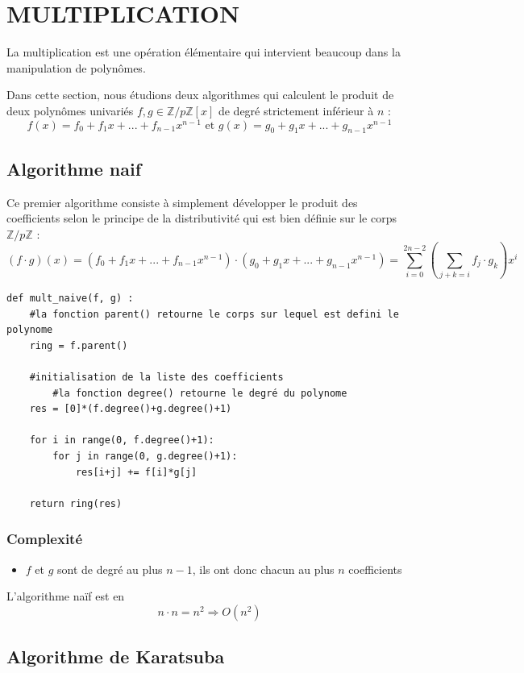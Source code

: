 \documentclass[a4paper]{article}
\begin{document}
\section{MULTIPLICATION}

La multiplication est une opération élémentaire qui intervient beaucoup dans la manipulation de polynômes.

Dans cette section, nous étudions deux algorithmes qui calculent le produit de deux polynômes univariés $f,g \in \mathbb{Z}/p\mathbb{Z}[x]$ de degré strictement inférieur à $n$ :
\[
f(x)=f_0+f_1x+...+f_{n-1}x^{n-1}\text{ et }g(x)=g_0+g_1x+...+g_{n-1}x^{n-1}
\]

\subsection{Algorithme naif}

Ce premier algorithme consiste à simplement développer le produit des coefficients selon le principe de la distributivité qui est bien définie sur le corps $\mathbb{Z}/p\mathbb{Z}$ :
\[
(f\cdot g)(x)=(f_0+f_1x+...+f_{n-1}x^{n-1})\cdot (g_0+g_1x+...+g_{n-1}x^{n-1})=\sum_{i=0}^{2n-2} (\sum_{j+k=i}f_j\cdot g_k) x^i
\]

\begin{lstlisting}[title={multiplication naive}]
def mult_naive(f, g) :
    #la fonction parent() retourne le corps sur lequel est defini le polynome
    ring = f.parent() 

    #initialisation de la liste des coefficients
        #la fonction degree() retourne le degré du polynome
    res = [0]*(f.degree()+g.degree()+1) 
    
    for i in range(0, f.degree()+1):
        for j in range(0, g.degree()+1):
            res[i+j] += f[i]*g[j]

    return ring(res) 
\end{lstlisting}

\subsubsection*{Complexité}
\begin{itemize} 
    \item $f$ et $g$ sont de degré au plus $n-1$, ils ont donc chacun au plus $n$ coefficients
\end{itemize}
L'algorithme naïf est en $$n\cdot n = n^2 \Longrightarrow O(n^2)$$

\subsection{Algorithme de Karatsuba}
\end{document}

